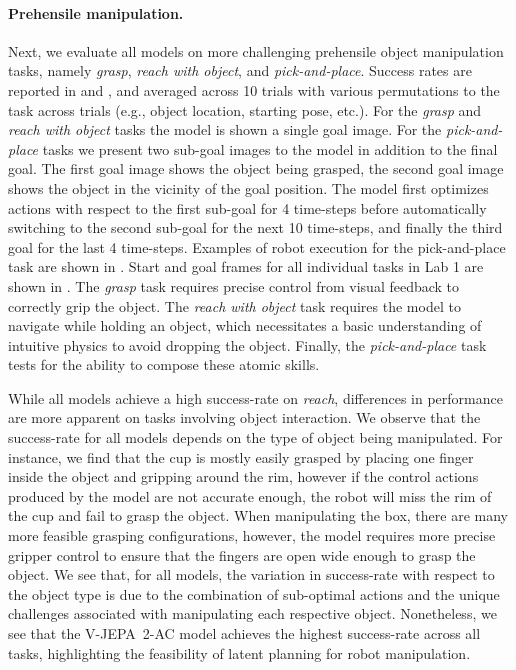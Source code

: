 \documentclass[]{fairmeta}
\newcommand{\acModel}{V-JEPA~2-AC\xspace}
\begin{document}
\paragraph{\bf Prehensile manipulation.}
Next, we evaluate all models on more challenging prehensile object manipulation tasks, namely \emph{grasp}, \emph{reach with object}, and \emph{pick-and-place}. Success rates are reported in  and , and averaged across 10 trials with various permutations to the task across trials (e.g., object location, starting pose, etc.).
For the \emph{grasp} and \emph{reach with object} tasks the model is shown a single goal image.
For the \emph{pick-and-place} tasks we present two sub-goal images to the model in addition to the final goal.
The first goal image shows the object being grasped, the second goal image shows the object in the vicinity of the goal position.
The model first optimizes actions with respect to the first sub-goal for 4 time-steps before automatically switching to the second sub-goal for the next 10 time-steps, and finally the third goal for the last 4 time-steps.
Examples of robot execution for the pick-and-place task are shown in .
Start and goal frames for all individual tasks in Lab 1 are shown in .
The \emph{grasp} task requires precise control from visual feedback to correctly grip the object.
The \emph{reach with object} task requires the model to navigate while holding an object, which necessitates a basic understanding of intuitive physics to avoid dropping the object.
Finally, the \emph{pick-and-place} task tests for the ability to compose these atomic skills.

While all models achieve a high success-rate on \emph{reach}, differences in performance are more apparent on tasks involving object interaction.
We observe that the success-rate for all models depends on the type of object being manipulated.
For instance, we find that the cup is mostly easily grasped by placing one finger inside the object and gripping around the rim, however if the control actions produced by the model are not accurate enough, the robot will miss the rim of the cup and fail to grasp the object.
When manipulating the box, there are many more feasible grasping configurations, however, the model requires more precise gripper control to ensure that the fingers are open wide enough to grasp the object.
We see that, for all models, the variation in success-rate with respect to the object type is due to the combination of sub-optimal actions and the unique challenges associated with manipulating each respective object.
Nonetheless, we see that the \acModel model achieves the highest success-rate across all tasks, highlighting the feasibility of latent planning for robot manipulation.
\end{document}
